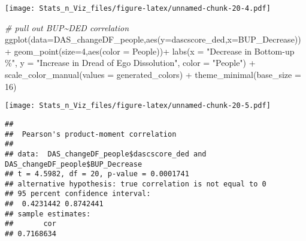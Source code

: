 \documentclass[
]{article}
\newenvironment{Shaded}{\begin{snugshade}}{\end{snugshade}}
\newcommand{\AttributeTok}[1]{\textcolor[rgb]{0.77,0.63,0.00}{#1}}
\newcommand{\CommentTok}[1]{\textcolor[rgb]{0.56,0.35,0.01}{\textit{#1}}}
\newcommand{\DecValTok}[1]{\textcolor[rgb]{0.00,0.00,0.81}{#1}}
\newcommand{\FunctionTok}[1]{\textcolor[rgb]{0.00,0.00,0.00}{#1}}
\newcommand{\NormalTok}[1]{#1}
\newcommand{\SpecialCharTok}[1]{\textcolor[rgb]{0.00,0.00,0.00}{#1}}
\newcommand{\StringTok}[1]{\textcolor[rgb]{0.31,0.60,0.02}{#1}}
\begin{document}
\texttt{[image: Stats\_n\_Viz\_files/figure-latex/unnamed-chunk-20-4.pdf]}

\begin{Shaded}
\begin{Highlighting}[]
\CommentTok{\# pull out BUP\textasciitilde{}DED correlation}
\FunctionTok{ggplot}\NormalTok{(}\AttributeTok{data=}\NormalTok{DAS\_changeDF\_people,}\FunctionTok{aes}\NormalTok{(}\AttributeTok{y=}\NormalTok{dascscore\_ded,}\AttributeTok{x=}\NormalTok{BUP\_Decrease))}\SpecialCharTok{+}
  \FunctionTok{geom\_point}\NormalTok{(}\AttributeTok{size=}\DecValTok{4}\NormalTok{,}\FunctionTok{aes}\NormalTok{(}\AttributeTok{color =}\NormalTok{ People))}\SpecialCharTok{+}
  \FunctionTok{labs}\NormalTok{(}\AttributeTok{x =} \StringTok{"Decrease in Bottom{-}up \%"}\NormalTok{, }\AttributeTok{y =} \StringTok{"Increase in Dread of Ego Dissolution"}\NormalTok{, }\AttributeTok{color =} \StringTok{"People"}\NormalTok{) }\SpecialCharTok{+}
  \FunctionTok{scale\_color\_manual}\NormalTok{(}\AttributeTok{values =}\NormalTok{ generated\_colors) }\SpecialCharTok{+}
  \FunctionTok{theme\_minimal}\NormalTok{(}\AttributeTok{base\_size =} \DecValTok{16}\NormalTok{)}
\end{Highlighting}
\end{Shaded}

\texttt{[image: Stats\_n\_Viz\_files/figure-latex/unnamed-chunk-20-5.pdf]}

\begin{Shaded}
\end{Shaded}

\begin{verbatim}
## 
##  Pearson's product-moment correlation
## 
## data:  DAS_changeDF_people$dascscore_ded and DAS_changeDF_people$BUP_Decrease
## t = 4.5982, df = 20, p-value = 0.0001741
## alternative hypothesis: true correlation is not equal to 0
## 95 percent confidence interval:
##  0.4231442 0.8742441
## sample estimates:
##       cor 
## 0.7168634
\end{verbatim}
\end{document}
